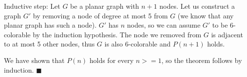 \documentclass[../main.tex]{subfiles}
\begin{document}
\begin{questions}
\begin{parts}
\begin{solution}
      Inductive step: Let $G$ be a planar graph with $n+1$ nodes. Let us construct a graph $G'$ by removing a node of degree at most 5 from $G$ (we know that any planar graph has such a node). $G'$ has $n$ nodes, so we can assume $G'$ to be 6-colorable by the induction hypothesis. The node we removed from $G$ is adjacent to at most 5 other nodes, thus $G$ is also 6-colorable and $P(n+1)$ holds.

      We have shown that $P(n)$ holds for every $n>=1$, so the theorem follows by induction. $\blacksquare$
    \end{solution}
  \end{parts}

\end{questions}
\end{document}

